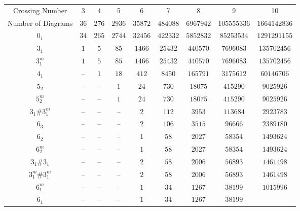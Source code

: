 \documentclass[amsmath,secnumarabic,amssymb,floatfix,nofootinbib,nobibnotes,letterpaper,11pt,tightenlines,showkeys]{revtex4}
\theoremstyle{definition}
\begin{document}
\begin{table}[H]
\begin{ruledtabular}
\begin{tabular}{ccccccccc}
Crossing Number &
3 & 4 & 5 & 6 & 7 & 8 & 9 & 10 \\
Number of Diagrams &
$\num{36}$ &
$\num{276}$ &
$\num{2936}$ &
$\num{35872}$ &
$\num{484088}$ &
$\num{6967942}$ &
$\num{105555336}$ &
$\num{1664142836}$\\ \hline
$0_1$ &
$\num{34}$ &
$\num{265}$ &
$\num{2744}$ &
$\num{32456}$ &
$\num{422332}$ &
$\num{5852832}$ &
$\num{85253534}$ &
$\num{1291291155}$\\
$3_{1}^{}$ &
$\num{1}$ &
$\num{5}$ &
$\num{85}$ &
$\num{1466}$ &
$\num{25432}$ &
$\num{440570}$ &
$\num{7696083}$ &
$\num{135702456}$\\
$3_{1}^{m}$ &
$\num{1}$ &
$\num{5}$ &
$\num{85}$ &
$\num{1466}$ &
$\num{25432}$ &
$\num{440570}$ &
$\num{7696083}$ &
$\num{135702456}$\\
$4_{1}^{}$ &
-- &
$\num{1}$ &
$\num{18}$ &
$\num{412}$ &
$\num{8450}$ &
$\num{165791}$ &
$\num{3175612}$ &
$\num{60146706}$\\
$5_{2}^{}$ &
-- &
-- &
$\num{1}$ &
$\num{24}$ &
$\num{730}$ &
$\num{18075}$ &
$\num{415290}$ &
$\num{9025926}$\\
$5_{2}^{m}$ &
-- &
-- &
$\num{1}$ &
$\num{24}$ &
$\num{730}$ &
$\num{18075}$ &
$\num{415290}$ &
$\num{9025926}$\\
$3_{1}^{}\#3_{1}^{m}$ &
-- &
-- &
-- &
$\num{2}$ &
$\num{112}$ &
$\num{3953}$ &
$\num{113684}$ &
$\num{2923783}$\\
$6_{3}^{}$ &
-- &
-- &
-- &
$\num{2}$ &
$\num{106}$ &
$\num{3515}$ &
$\num{96666}$ &
$\num{2389180}$\\
$6_{2}^{}$ &
-- &
-- &
-- &
$\num{1}$ &
$\num{58}$ &
$\num{2027}$ &
$\num{58354}$ &
$\num{1493624}$\\
$6_{2}^{m}$ &
-- &
-- &
-- &
$\num{1}$ &
$\num{58}$ &
$\num{2027}$ &
$\num{58354}$ &
$\num{1493624}$\\
$3_{1}^{}\#3_{1}^{}$ &
-- &
-- &
-- &
$\num{2}$ &
$\num{58}$ &
$\num{2006}$ &
$\num{56893}$ &
$\num{1461498}$\\
$3_{1}^{m}\#3_{1}^{m}$ &
-- &
-- &
-- &
$\num{2}$ &
$\num{58}$ &
$\num{2006}$ &
$\num{56893}$ &
$\num{1461498}$\\
$6_{1}^{m}$ &
-- &
-- &
-- &
$\num{1}$ &
$\num{34}$ &
$\num{1267}$ &
$\num{38199}$ &
$\num{1015996}$\\
$6_{1}^{}$ &
-- &
-- &
-- &
$\num{1}$ &
$\num{34}$ &
$\num{1267}$ &
$\num{38199}$ &

\end{tabular}
\end{ruledtabular}
\end{table}
\end{document}
